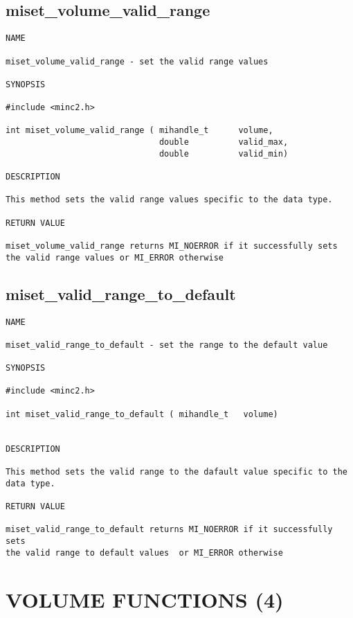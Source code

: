 \documentclass{article}
\begin{document}
\subsection{miset\_volume\_valid\_range}
\begin{verbatim}
NAME 

miset_volume_valid_range - set the valid range values

SYNOPSIS

#include <minc2.h>

int miset_volume_valid_range ( mihandle_t      volume,
                               double          valid_max,
                               double          valid_min)
                                
DESCRIPTION

This method sets the valid range values specific to the data type.

RETURN VALUE

miset_volume_valid_range returns MI_NOERROR if it successfully sets 
the valid range values or MI_ERROR otherwise
\end{verbatim}

\subsection{miset\_valid\_range\_to\_default}
\begin{verbatim}
NAME 

miset_valid_range_to_default - set the range to the default value

SYNOPSIS

#include <minc2.h>

int miset_valid_range_to_default ( mihandle_t   volume)
                        
                                
DESCRIPTION

This method sets the valid range to the dafault value specific to the
data type.

RETURN VALUE

miset_valid_range_to_default returns MI_NOERROR if it successfully sets 
the valid range to default values  or MI_ERROR otherwise
\end{verbatim}

\section{VOLUME FUNCTIONS (4)}
\end{document}
